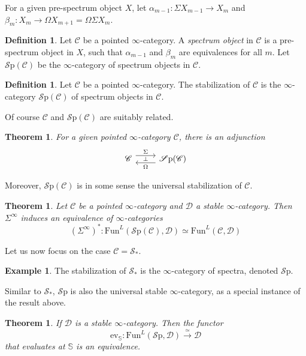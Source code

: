 \documentclass[10pt]{amsart}
\newcommand{\C}{\mathscr{C}}
\newcommand{\D}{\mathscr{D}}
\newcommand{\s}{\mathscr{S}}
\newcommand{\bS}{\mathbb{S}}
\newcommand{\Sp}{\mathscr{S}\mathrm{p}}
\newcommand{\Fun}{\mathrm{Fun}}
\newtheorem{theorem}[equation]{Theorem}
\theoremstyle{definition}
\newtheorem{definition}[equation]{Definition}
\newtheorem{example}[equation]{Example}
\theoremstyle{remark}
\begin{document}
For a given pre-spectrum object $X$, let $\alpha_{m-1}\colon \Sigma X_{m-1} \to X_m$ and $\beta_m \colon X_m \to \Omega X_{m+1} = \Omega \Sigma X_m$. 

\begin{definition}
  Let $\C$ be a pointed $\infty$-category. A \emph{spectrum object} in $\C$ is a pre-spectrum object in $X$, such that $\alpha_{m-1}$ and $\beta_m$ are equivalences for all $m$. Let $\Sp(\C)$ be the $\infty$-category of spectrum objects in $\C$.
\end{definition}

\begin{definition}
  Let $\C$ be a pointed $\infty$-category. The stabilization of $\C$ is the $\infty$-category $\Sp(\C)$ of spectrum objects in $\C$. 
\end{definition}
Of course $\C$ and $\Sp(\C)$ are suitably related.

\begin{theorem}
  For a given pointed $\infty$-category $\C$, there is an adjunction
  \[
  \begin{tikzcd}
    \C \arrow[r, shift left=1.8, "\Sigma"] \arrow[r, shift right=1.8, "\Omega"', "\bot", leftarrow] &  \Sp(\C) 
  \end{tikzcd}
  \]
\end{theorem}

Moreover, $\Sp(\C)$ is in some sense the universal stabilization of $\C$.

\begin{theorem}
 Let $\C$ be a pointed $\infty$-category and $\D$ a stable $\infty$-category. Then $\Sigma^\infty$ induces an equivalence of $\infty$-categories
 \[(\Sigma^\infty)^* \colon\Fun^L(\Sp(\C),\D) \simeq \Fun^L(\C,\D)\]
\end{theorem}

Let us now focus on the case $\C = \s_*$.

\begin{example}
  The stabilization of $\s_*$ is the $\infty$-category of spectra, denoted $\Sp$.
\end{example}

Similar to $\s_*$, $\Sp$ is also the universal stable $\infty$-category, as a special instance of the result above.

\begin{theorem}
 If $\D$ is a stable $\infty$-category. Then the functor 
  \[\mathrm{ev}_{\bS}\colon\Fun^L(\Sp,\D) \xrightarrow{ \ \simeq \ } \D \]
  that evaluates at $\bS$ is an equivalence. 
\end{theorem}
\end{document}
